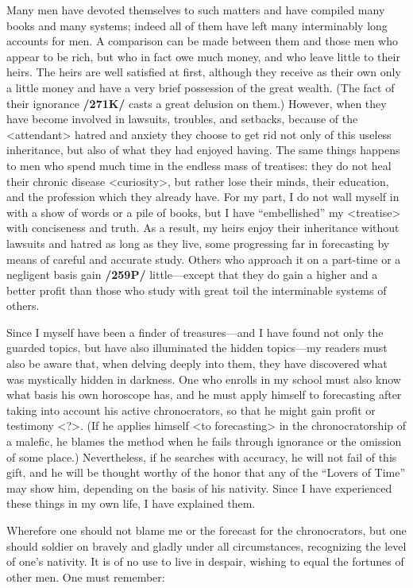 Many men have devoted themselves to such matters and have compiled many books and many systems; indeed all of them have left many interminably long accounts for men. A comparison can be
made between them and those men who appear to be rich, but who in fact owe much money, and who leave little to their heirs. The heirs are well satisfied at first, although they receive as their own only a little money and have a very brief possession of the great wealth. (The fact of their ignorance \textbf{/271K/} casts a great delusion on them.) However, when they have become involved in lawsuits, troubles, and setbacks, because of the <attendant> hatred and anxiety they choose to get rid not only of this useless inheritance,
but also of what they had enjoyed having. The same things happens to men who spend much time in the endless mass of treatises: they do not heal their chronic disease <curiosity>, but rather lose their minds, their education, and the profession which they already have.
For my part, I do not wall myself in with a show of words or a pile of books, but I have “embellished” my <treatise> with conciseness and truth. As a result, my heirs enjoy their inheritance without lawsuits and hatred as long as they live, some progressing far in forecasting by means of careful and accurate study. Others who approach it on a part-time or a negligent basis gain \textbf{/259P/} little—except that
they do gain a higher and a better profit than those who study with great toil the interminable systems of others.

Since I myself have been a finder of treasures—and I have found not only the guarded topics, but have also illuminated the hidden topics—my readers must also be aware that, when delving deeply into them,
they have discovered what was mystically hidden in darkness. One who enrolls in my school must also know what basis his own horoscope has, and he must apply himself to forecasting after taking into account
his active chronocrators, so that he might gain profit or testimony <?>. (If he applies himself <to forecasting> in the chronocratorship of a malefic, he blames the method when he fails through ignorance or the omission of some place.) Nevertheless, if he searches with accuracy, he will not fail of this gift, and he will be thought worthy of the honor that any of the “Lovers of Time” may show him, depending on the basis of his nativity. Since I have experienced these things in my own life, I have explained them.

Wherefore one should not blame me or the forecast for the chronocrators, but one should soldier on bravely and gladly under all circumstances, recognizing the level of one’s nativity. It is of no use to live in despair, wishing to equal the fortunes of other men. One must remember: 

